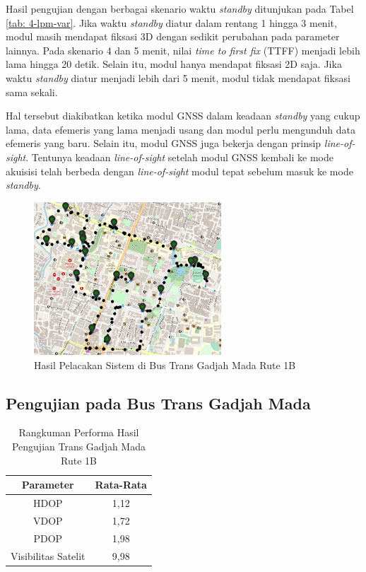 \documentclass[conference]{IEEEtran}
\begin{document}
Hasil pengujian dengan berbagai skenario waktu \textit{standby} ditunjukan pada Tabel \ref{tab: 4-lpm-var}. Jika waktu \textit{standby} diatur dalam rentang 1 hingga 3 menit, modul masih mendapat fiksasi 3D dengan sedikit perubahan pada parameter lainnya. Pada skenario 4 dan 5 menit, nilai \textit{time to first fix} (TTFF) menjadi lebih lama hingga 20 detik. Selain itu, modul hanya mendapat fiksasi 2D saja. Jika waktu \textit{standby} diatur menjadi lebih dari 5 menit, modul tidak mendapat fiksasi sama sekali.

Hal tersebut diakibatkan ketika modul GNSS dalam keadaan \textit{standby} yang cukup lama, data efemeris yang lama menjadi usang dan modul perlu mengunduh data efemeris yang baru. Selain itu, modul GNSS juga bekerja dengan prinsip \textit{line-of-sight}. Tentunya keadaan \textit{line-of-sight} setelah modul GNSS kembali ke mode akuisisi telah berbeda dengan \textit{line-of-sight} modul tepat sebelum masuk ke mode \textit{standby}.

\begin{figure}[htb!]
	\centering
	\includegraphics[width=7cm]{tracked-route.png}
	\caption{Hasil Pelacakan Sistem di Bus Trans Gadjah Mada Rute 1B}
	\label{Fig: 4-tgm-tracked}
\end{figure}

\subsection{Pengujian pada Bus Trans Gadjah Mada}
\begin{table}[H]
	\caption{Rangkuman Performa Hasil Pengujian Trans Gadjah Mada Rute 1B}
	\centering
	\renewcommand{\arraystretch}{1.5}
	\begin{tabular}{cc}
		\hline
		\textbf{Parameter} & \textbf{Rata-Rata} \\\hline
		HDOP & 1,12\\
		VDOP & 1,72\\
		PDOP &  1,98\\
		Visibilitas Satelit & 9,98\\
		\hline
	\end{tabular}
	\label{tab: 4-tgm-performance}
\end{table}
\end{document}
